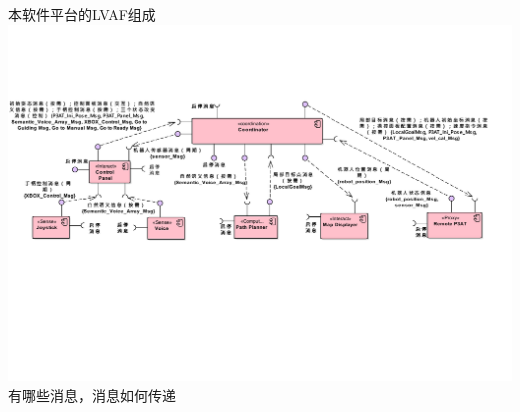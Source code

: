\documentclass{beamer}
\begin{document}
\begin{frame}[t]{本软件平台的LVAF组成}
    \includegraphics[scale=0.38]{./resource/graph/5.pdf}
    有哪些消息，消息如何传递
\end{frame}
\end{document}

